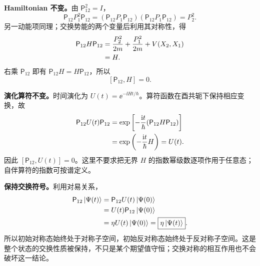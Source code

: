 \begin{checkedsolution}
\textbf{Hamiltonian 不变。}由 $\mathsf P_{12}^2=I$，
\begin{equation}
  \mathsf P_{12}P_1^2\mathsf P_{12}
   =(\mathsf P_{12}P_1\mathsf P_{12})
    (\mathsf P_{12}P_1\mathsf P_{12})=P_2^2.
\end{equation}
另一动能项同理；交换势能的两个变量后利用其对称性，得
\begin{align}
  \mathsf P_{12}H\mathsf P_{12}
   &=\frac{P_2^2}{2m}+\frac{P_1^2}{2m}+V(X_2,X_1)\notag\\
   &=H.
\end{align}
右乘 $\mathsf P_{12}$ 即有 $\mathsf P_{12}H=H\mathsf P_{12}$，所以
\begin{equation}
  \boxed{[\mathsf P_{12},H]=0}.
\end{equation}

\textbf{演化算符不变。}时间演化为 $U(t)=\ee^{-\ii Ht/\hbar}$。算符函数在酉共轭下保持相应变换，故
\begin{align}
  \mathsf P_{12}U(t)\mathsf P_{12}
   &=\exp\left[-\frac{\mathrm{i} t}{\hbar}
       (\mathsf P_{12}H\mathsf P_{12})\right]\notag\\
   &=\exp\left(-\frac{\mathrm{i} t}{\hbar}H\right)=U(t).
\end{align}
因此 $[\mathsf P_{12},U(t)]=0$。这里不要求把无界 $H$ 的指数幂级数逐项作用于任意态；自伴算符的指数可按谱定义。

\textbf{保持交换符号。}利用对易关系，
\begin{align}
  \mathsf P_{12}\left|\Psi(t)\right\rangle
   &=\mathsf P_{12}U(t)\left|\Psi(0)\right\rangle\notag\\
   &=U(t)\mathsf P_{12}\left|\Psi(0)\right\rangle\notag\\
   &=\eta U(t)\left|\Psi(0)\right\rangle
    =\boxed{\eta\left|\Psi(t)\right\rangle}.
\end{align}
所以初始对称态始终处于对称子空间，初始反对称态始终处于反对称子空间。这是整个状态的交换性质被保持，不只是某个期望值守恒；交换对称的相互作用也不会破坏这一结论。
\end{checkedsolution}
